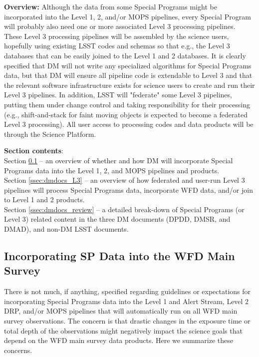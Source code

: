 \documentclass[DM,lsstdraft,toc]{lsstdoc}
\begin{document}
\textbf{Overview:} Although the data from some Special Programs might be incorporated into the Level 1, 2, and/or MOPS pipelines, every Special Program will probably also need one or more associated Level 3 processing pipelines. These Level 3 processing pipelines will be assembled by the science users, hopefully using existing LSST codes and schemas so that e.g., the Level 3 databases that can be easily joined to the Level 1 and 2 databases. It is clearly specified that DM will not write any specialized algorithms for Special Programs data, but that DM will ensure all pipeline code is extendable to Level 3 and that the relevant software infrastructure exists for science users to create and run their Level 3 pipelines. In addition, LSST will "federate" some Level 3 pipelines, putting them under change control and taking responsibility for their processing (e.g., shift-and-stack for faint moving objects is expected to become a federated Level 3 processing). All user access to processing codes and data products will be through the Science Platform. 

\textbf{Section contents}: \\
Section \ref{ssec:dmdocs_SPinWFD} -- an overview of whether and how DM will incorporate Special Programs data into the Level 1, 2, and MOPS pipelines and products. \\
Section \ref{ssec:dmdocs_L3} -- an overview of how federated and user-run Level 3 pipelines will process Special Programs data, incorporate WFD data, and/or join to Level 1 and 2 products. \\
Section \ref{ssec:dmdocs_review} -- a detailed break-down of Special Programs (or Level 3) related content in the three DM documents (DPDD, DMSR, and DMAD), and non-DM LSST documents. \\



\subsection{Incorporating SP Data into the WFD Main Survey}\label{ssec:dmdocs_SPinWFD}

There is not much, if anything, specified regarding guidelines or expectations for incorporating Special Programs data into the Level 1 and Alert Stream, Level 2 DRP, and/or MOPS pipelines that will automatically run on all WFD main survey observations. The concern is that drastic changes in the exposure time or total depth of the observations might negatively impact the science goals that depend on the WFD main survey data products. Here we summarize these concerns.
\end{document}
